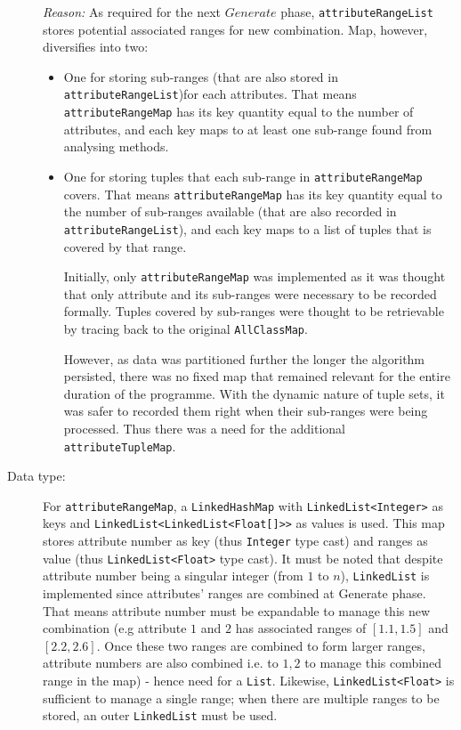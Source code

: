 \begin{description}
\textit{Reason: } As required for the next $Generate$ phase, \texttt{attributeRangeList} stores potential associated ranges for new combination. 
Map, however, diversifies into two: 
\begin{itemize}
	\item One for storing sub-ranges (that are also stored in \texttt{attributeRangeList})for each attributes. That means \texttt{attributeRangeMap} has its key quantity equal to the number of attributes, and each key maps to at least one sub-range found from analysing methods.
	
	\item One for storing tuples that each sub-range in \texttt{attributeRangeMap} covers. That means \texttt{attributeRangeMap} has its key quantity equal to the number of sub-ranges available (that are also recorded in \texttt{attributeRangeList}), and each key maps to a list of tuples that is covered by that range.
	
Initially, only \texttt{attributeRangeMap} was implemented as it was thought that only attribute and its sub-ranges were necessary to be recorded formally. Tuples covered by sub-ranges were thought to be retrievable by tracing back to the original \texttt{AllClassMap}.
	
However, as data was partitioned further the longer the algorithm persisted, there was no fixed map that remained relevant for the entire duration of the programme. With the dynamic nature of tuple sets, it was safer to recorded them right when their sub-ranges were being processed. Thus there was a need for the additional \texttt{attributeTupleMap}.
\end{itemize}

\item[Data type: ] For \texttt{attributeRangeMap}, a \texttt{LinkedHashMap} with \texttt{LinkedList<Integer>} as keys and \texttt{LinkedList<LinkedList<Float[]>>} as values is used. This map stores attribute number as key (thus \texttt{Integer} type cast) and ranges as value (thus \texttt{LinkedList<Float>} type cast). It must be noted that despite attribute number being a singular integer (from $1$ to $n$), \texttt{LinkedList} is implemented since attributes' ranges are combined at Generate phase. That means attribute number must be expandable to manage this new combination (e.g attribute $1$ and $2$ has associated ranges of $[1.1,1.5]$ and $[2.2, 2.6]$. Once these two ranges are combined to form larger ranges, attribute numbers are also combined i.e. to ${1,2}$ to manage this combined range in the map) - hence need for a \texttt{List}. Likewise, \texttt{LinkedList<Float>} is sufficient to manage a single range; when there are multiple ranges to be stored, an outer \texttt{LinkedList} must be used.


\end{description}
